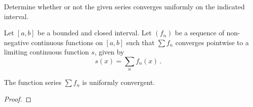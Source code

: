 \documentclass[week=6]{homework}
\begin{document}
\begin{questions}
        \question
        Determine whether or not the given series converges uniformly on the indicated interval.
        \begin{parts}
        	\part $\displaystyle \sum \frac{x^k}{k^2}$ with $x \in [0,1]$.
        	
        	\part $\displaystyle \sum x^ke^{-kx}$ with $x \in [0,\infty)$.
        	
        	\part $\displaystyle \sum k^re^{-kx}$ with $x \in [a,\infty)$, where $a > 0$ and $r \in \reals$ a constant.
        	
        	\part $\displaystyle \sum \frac{1}{x^k + 1}$ with $x \in (0,1]$.
        	
        	\part $\displaystyle \sum \frac{1}{x^k + 1}$ with $x \in (1,\infty)$.
        \end{parts}
	    
	    \question
	    
	    \question
	    Let $[a,b]$ be a bounded and closed interval. Let $(f_n)$ be a sequence of non-negative continuous functions on $[a,b]$ such that $\sum f_n$ converges pointwise to a limiting continuous function $s$, given by
	    \[
		    s(x) = \sum_n f_n(x)\,.
	    \]
	    \begin{toprove}
	    	The function series $\sum f_n$ is uniformly convergent.
	    \end{toprove}
	    \begin{proof}
	    \end{proof}
     \end{questions}
\end{document}
